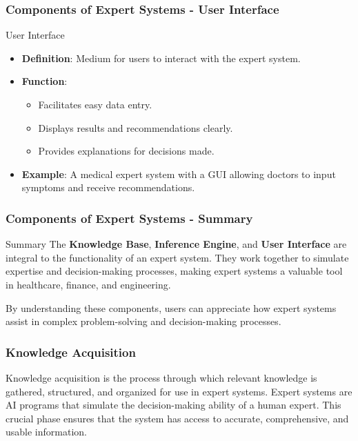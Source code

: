 \documentclass[aspectratio=169]{beamer}
\begin{document}
\begin{frame}[fragile]
    \frametitle{Components of Expert Systems - User Interface}
    \begin{block}{User Interface}
        \begin{itemize}
            \item \textbf{Definition}: Medium for users to interact with the expert system.
            \item \textbf{Function}:
            \begin{itemize}
                \item Facilitates easy data entry.
                \item Displays results and recommendations clearly.
                \item Provides explanations for decisions made.
            \end{itemize}
            \item \textbf{Example}: A medical expert system with a GUI allowing doctors to input symptoms and receive recommendations.
        \end{itemize}
    \end{block}
\end{frame}

\begin{frame}[fragile]
    \frametitle{Components of Expert Systems - Summary}
    \begin{block}{Summary}
        The \textbf{Knowledge Base}, \textbf{Inference Engine}, and \textbf{User Interface} are integral to the functionality of an expert system. They work together to simulate expertise and decision-making processes, making expert systems a valuable tool in healthcare, finance, and engineering.
    \end{block}
    By understanding these components, users can appreciate how expert systems assist in complex problem-solving and decision-making processes.
\end{frame}

\begin{frame}[fragile]
    \frametitle{Knowledge Acquisition}
    Knowledge acquisition is the process through which relevant knowledge is gathered, structured, and organized for use in expert systems. 
    Expert systems are AI programs that simulate the decision-making ability of a human expert. This crucial phase ensures that the system has access to accurate, comprehensive, and usable information.
\end{frame}
\end{document}
